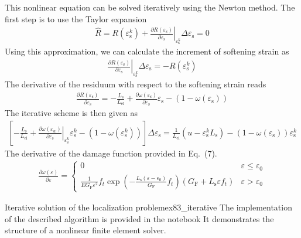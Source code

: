 \documentclass[main.tex]{subfiles}
\begin{document}
This nonlinear equation can be solved iteratively using the Newton method. The first step is to use the Taylor expansion 
\begin{align}
\hat{R} = R(\varepsilon_\mathrm{s}^k) + 
\left.
\frac{ \partial R(\varepsilon_\mathrm{s}) }{ \partial \varepsilon_\mathrm{s} }
\right|_{\varepsilon_\mathrm{s}^k}
\Delta \varepsilon_\mathrm{s}
= 0
\end{align}
Using this approximation, we can calculate the increment of softening strain as
\begin{align}
\left.
\frac{ \partial R(\varepsilon_\mathrm{s}) }{ \partial \varepsilon_\mathrm{s} }
\right|_{\varepsilon_\mathrm{s}^k}
\Delta \varepsilon_\mathrm{s}
= 
-
R(\varepsilon_\mathrm{s}^k) 
\end{align}
The derivative of the residuum with respect to the softening strain reads
\begin{align}
\frac{ \partial R(\varepsilon_\mathrm{s}) }{ \partial \varepsilon_\mathrm{s} }
=
- 
\frac{L_\mathrm{s}} { L_\mathrm{el}} 
+
\frac{ \partial \omega(\varepsilon_\mathrm{s}) }{ \partial \varepsilon_\mathrm{s} }
\varepsilon_\mathrm{s}
- (1- \omega(\varepsilon_\mathrm{s}))
\end{align}
The iterative scheme is then given as
\begin{align}
\left[
- 
 \frac{L_\mathrm{s}} { L_\mathrm{el}} 
+
\left.
\frac{ \partial \omega(\varepsilon_w) }{ \partial \varepsilon_\mathrm{s} }
\right|_{\varepsilon_\mathrm{s}^k}
\varepsilon_\mathrm{s}^k
-
\left( 
1 - \omega(\varepsilon_\mathrm{s}^k)
\right )
\right] 
\Delta \varepsilon_\mathrm{s}
=
\frac{1}{ L_\mathrm{el} }
\left(
u - \varepsilon_\mathrm{s}^k L_\mathrm{s}
\right)
 - (1 - \omega(\varepsilon_\mathrm{s}))  \varepsilon_\mathrm{s}^k
\end{align}
The derivative of the damage function provided in Eq. (7).
\begin{align}
\frac{ \partial \omega(\varepsilon) }{\partial \varepsilon }
= \left\{ 
\begin{array}{ll}
0  &   \varepsilon \le \varepsilon_0 \\
\displaystyle{\frac{1}{E G_{\mathrm{F}} \varepsilon^{2}}}
f_{t} 
\exp \left({
- \displaystyle{\frac{L_\mathrm{s} (\varepsilon - \epsilon_{0})}{G_\mathrm{F}} f_{t}}} \right)
\left(G_\mathrm{F} + L_\mathrm{s} \varepsilon f_{t}\right)
 &  
\varepsilon > \varepsilon_0
\end{array}
\right.
\end{align}

\begin{bmcsex}{Iterative solution of the localization problem}{ex83_iterative}
The implementation of the described algorithm is provided in the notebook
It demonstrates the structure of a nonlinear finite element solver.
\end{bmcsex}
\end{document}
